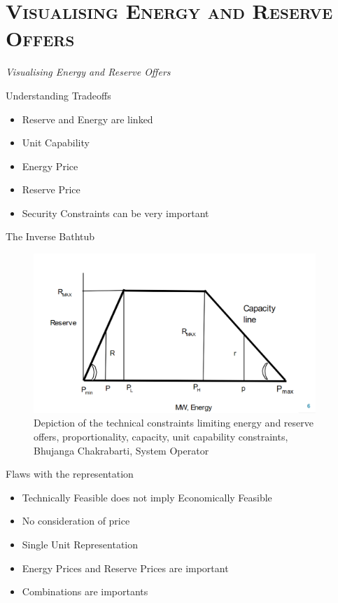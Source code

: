 \documentclass[xcolor=x11names,compress]{beamer}
\renewcommand{\(}{\begin{columns}}
\renewcommand{\)}{\end{columns}}
\newcommand{\<}[1]{\begin{column}{#1}}
\renewcommand{\>}{\end{column}}
\begin{document}
\section{\scshape Visualising Energy and Reserve Offers}
\begin{frame}
\vspace{1.5cm}
\begin{center}
{\Huge\textit{Visualising Energy and Reserve Offers}}
\end{center}
\end{frame}

\begin{frame}{Understanding Tradeoffs}
\begin{itemize}
\item Reserve and Energy are linked
\item Unit Capability
\item Energy Price
\item Reserve Price
\item Security Constraints can be very important
\end{itemize}
\end{frame}

\begin{frame}{The Inverse Bathtub}
\begin{figure}
\centering
\includegraphics[width=0.95\textwidth]{img/Bathtub_Constraint_Image.png}
\caption{Depiction of the technical constraints limiting energy and reserve
offers, proportionality, capacity, unit capability constraints, Bhujanga
Chakrabarti, System Operator}
\end{figure}
\end{frame}

\begin{frame}{Flaws with the representation}
\begin{itemize}
\item Technically Feasible does not imply Economically Feasible
\item No consideration of price
\item Single Unit Representation
\end{itemize}
\begin{itemize}
\item Energy Prices and Reserve Prices are important
\item Combinations are importants
\end{itemize}
\end{frame}
\end{document}
